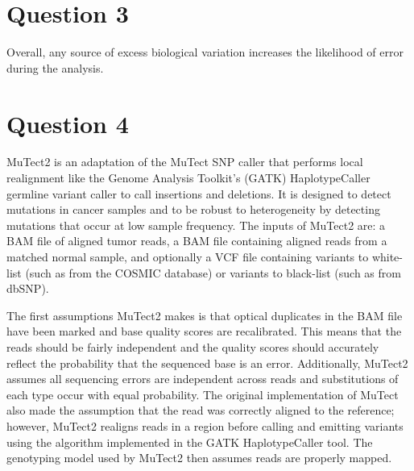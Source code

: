 \section{Question 3}


Overall, any source of excess biological variation increases the likelihood of error during the analysis. 



\section{Question 4}

MuTect2 \parencite{cibulskis_sensitive_2013} is an adaptation of the MuTect SNP caller that performs local realignment like the Genome Analysis Toolkit's (GATK) HaplotypeCaller germline variant caller to call insertions and deletions. It is designed to detect mutations in cancer samples and to be robust to heterogeneity by detecting mutations that occur at low sample frequency. The inputs of MuTect2 are: a BAM file of aligned tumor reads, a BAM file containing aligned reads from a matched normal sample, and optionally a VCF file containing variants to white-list (such as from the COSMIC database) or variants to black-list (such as from dbSNP). 

The first assumptions MuTect2 makes is that optical duplicates in the BAM file have been marked and base quality scores are recalibrated. This means that the reads should be fairly independent and the quality scores should accurately reflect the probability that the sequenced base is an error. Additionally, MuTect2 assumes all sequencing errors are independent across reads and substitutions of each type occur with equal probability.
The original implementation of MuTect also made the assumption that the read was correctly aligned to the reference; however, MuTect2 realigns reads in a region before calling and emitting variants using the algorithm implemented in the GATK HaplotypeCaller tool. The genotyping model used by MuTect2 then assumes reads are properly mapped.

